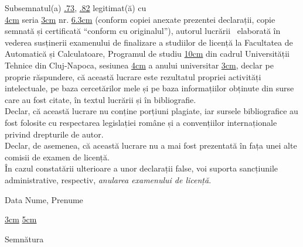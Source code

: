 \begin{minipage}{\linewidth}
	Subsemnatul(a) \uline{.73\linewidth},
	\uline{.82\linewidth}
	legitimat(ă) cu\\ \uline{4cm} seria \uline{3cm} nr. \uline{6.3cm}
	(conform copiei anexate prezentei declarații, copie semnată și certificată ``conform cu originalul''), autorul lucrării\
	\uline{\linewidth}
	\uline{\linewidth}
	\uline{\linewidth}
	elaborată în vederea susținerii examenului de finalizare a studiilor de licență la Facultatea de Automatică și Calculatoare, Programul de studiu \uline{10cm} din cadrul Universității Tehnice din Cluj-Napoca, sesiunea \uline{4cm} a anului universitar \uline{3cm}, declar pe proprie răspundere, că această lucrare este rezultatul propriei activități intelectuale, pe baza cercetărilor mele și pe baza informațiilor obținute din surse care au fost citate, în textul lucrării și în bibliografie.\\
	Declar, că această lucrare nu conține porțiuni plagiate, iar sursele bibliografice au fost folosite cu respectarea legislației române și a convențiilor internaționale privind drepturile de autor.\\
	Declar, de asemenea, că această lucrare nu a mai fost prezentată în fața unei alte comisii de examen de licență.\\
	În cazul constatării ulterioare a unor declarații false, voi suporta sancțiunile administrative, respectiv, \emph{anularea examenului de licență}.
\end{minipage}
\vspace{1.5cm}

Data \hspace{8cm} Nume, Prenume

\vspace{0.5cm}

\uline{3cm} \hspace{5cm} \uline{5cm}

\vspace{1cm}
\hspace{9.4cm}Semnătura
\newpage

